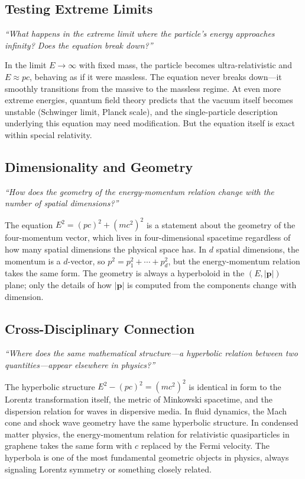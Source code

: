 \documentclass[11pt,openright]{book}
\begin{document}
\subsection*{Testing Extreme Limits}
\textit{``What happens in the extreme limit where the particle's energy approaches infinity? Does the equation break down?''}

In the limit $E \to \infty$ with fixed mass, the particle becomes ultra-relativistic and $E \approx pc$, behaving as if it were massless. The equation never breaks down---it smoothly transitions from the massive to the massless regime. At even more extreme energies, quantum field theory predicts that the vacuum itself becomes unstable (Schwinger limit, Planck scale), and the single-particle description underlying this equation may need modification. But the equation itself is exact within special relativity.

\subsection*{Dimensionality and Geometry}
\textit{``How does the geometry of the energy-momentum relation change with the number of spatial dimensions?''}

The equation $E^2 = (pc)^2 + (mc^2)^2$ is a statement about the geometry of the four-momentum vector, which lives in four-dimensional spacetime regardless of how many spatial dimensions the physical space has. In $d$ spatial dimensions, the momentum is a $d$-vector, so $p^2 = p_1^2 + \cdots + p_d^2$, but the energy-momentum relation takes the same form. The geometry is always a hyperboloid in the $(E, |\mathbf{p}|)$ plane; only the details of how $|\mathbf{p}|$ is computed from the components change with dimension.

\subsection*{Cross-Disciplinary Connection}
\textit{``Where does the same mathematical structure---a hyperbolic relation between two quantities---appear elsewhere in physics?''}

The hyperbolic structure $E^2 - (pc)^2 = (mc^2)^2$ is identical in form to the Lorentz transformation itself, the metric of Minkowski spacetime, and the dispersion relation for waves in dispersive media. In fluid dynamics, the Mach cone and shock wave geometry have the same hyperbolic structure. In condensed matter physics, the energy-momentum relation for relativistic quasiparticles in graphene takes the same form with $c$ replaced by the Fermi velocity. The hyperbola is one of the most fundamental geometric objects in physics, always signaling Lorentz symmetry or something closely related.
\end{document}
